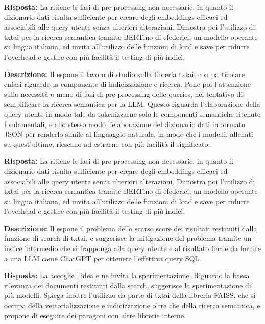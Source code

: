 \textbf{Risposta: }La  ritiene le fasi di pre-processing non necessarie, in quanto il dizionario dati risulta sufficiente per creare degli embeddings efficaci ed associabili alle query utente senza ulteriori alterazioni. 
Dimostra poi l'utilizzo di txtai per la ricerca semantica tramite BERTino di efederici, un modello operante su lingua italiana, ed invita all'utilizzo delle funzioni di load e save per ridurre l'overhead e gestire con più facilità il testing di più indici.

\textbf{Descrizione:} Il  espone il lavoro di studio sulla libreria txtai, con particolare enfasi riguardo la componente di indicizzazione e ricerca. 
Pone poi l'attenzione sulla necessità o meno di fasi di pre-processing delle queries, nel tentativo di semplificare la ricerca semantica per la LLM. 
Questo riguarda l'elaborazione della query utente in modo tale da tokenizzarne solo le componenti semantiche ritenute fondamentali, e allo stesso modo l'elaborazione del dizionario dati in formato JSON per renderlo simile al linguaggio naturale, in modo che i modelli, allenati su quest'ultimo, riescano ad estrarne con più facilità il significato.

\textbf{Risposta: }La  ritiene le fasi di pre-processing non necessarie, in quanto il dizionario dati risulta sufficiente per creare degli embeddings efficaci ed associabili alle query utente senza ulteriori alterazioni. 
Dimostra poi l'utilizzo di txtai per la ricerca semantica tramite BERTino di efederici, un modello operante su lingua italiana, ed invita all'utilizzo delle funzioni di load e save per ridurre l'overhead e gestire con più facilità il testing di più indici.

\textbf{Descrizione:} Il  espone il problema dello scarso score dei risultati restituiti dalla funzione di search di txtai, e suggerisce la mitigazione del problema tramite un indice intermedio che si frapponga alla query utente e al risultato finale da fornire a una LLM come ChatGPT per ottenere l'effettiva query SQL.

\textbf{Risposta: }La  accoglie l'idea e ne invita la sperimentazione. 
Riguardo la bassa rilevanza dei documenti restituiti dalla search, suggerisce la sperimentazione di più modelli. 
Spiega inoltre l'utilizzo da parte di txtai della libreria FAISS, che si occupa della vettorializzazione e indicizzazione oltre che della ricerca semantica, e propone di eseguire dei paragoni con altre librerie interne.

